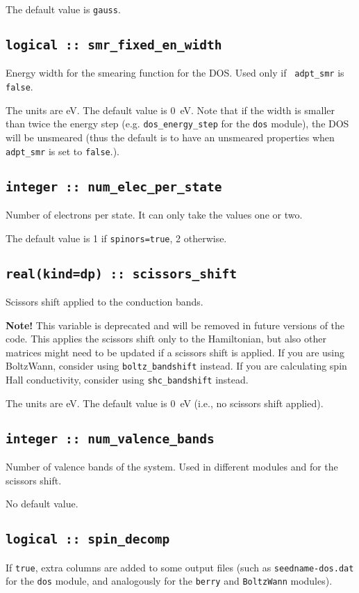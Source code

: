 The default value is {\tt gauss}.

\subsection[smr\_fixed\_en\_width]{\tt logical :: smr\_fixed\_en\_width}
Energy width for the smearing function for the DOS. Used only if {\tt
  adpt\_smr} is \verb#false#.

The units are eV. The default value is 0~eV. Note that if the width is
smaller than twice the energy step (e.g. {\tt dos\_energy\_step} for
the {\tt dos} module), the DOS
will be unsmeared (thus the default is to have an unsmeared
properties when {\tt  adpt\_smr} is set to \verb#false#.).


  \subsection{\tt integer :: num\_elec\_per\_state} 
Number of electrons per state. It can only take the values one or
two.

The default value is 1 if {\tt spinors=true}, 2 otherwise.

  \subsection{\tt real(kind=dp) :: scissors\_shift} 
Scissors shift applied to the conduction bands.

\textbf{Note!} This variable is deprecated and will be removed in future
versions of the code. This applies the scissors shift only to the Hamiltonian,
but also other matrices might need to be updated if a scissors shift is 
applied. If you are using BoltzWann, consider using \texttt{boltz\_bandshift} instead. 
If you are calculating spin Hall conductivity, consider using \texttt{shc\_bandshift} instead.

The units are eV. The default value is 0~eV (i.e., no scissors shift applied).

  \subsection{\tt integer :: num\_valence\_bands} 
Number of valence bands of the system. Used in different modules and
for the scissors shift.

No default value.


\subsection[spin\_decomp]{\tt logical :: spin\_decomp}
If {\tt true}, extra columns are added to some output files (such as
{\tt seedname-dos.dat} for the {\tt dos} module, and analogously for
the {\tt berry} and {\tt BoltzWann} modules).

